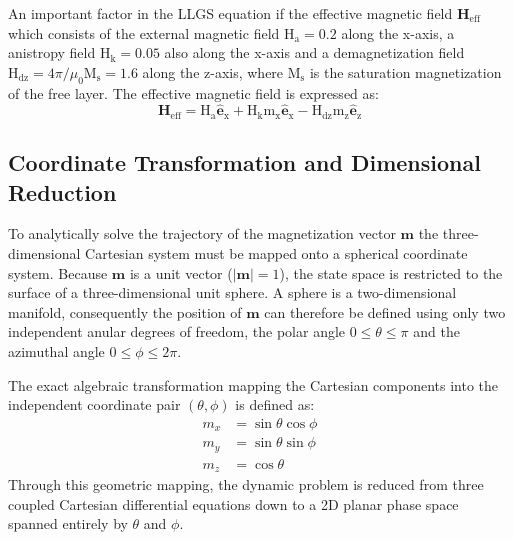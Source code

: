 \documentclass[reprint,amsmath,amssymb,aps, floatfix]{revtex4-2}
\begin{document}
An important factor in the LLGS equation if the effective magnetic field $\mathbf{H}_{\text{eff}}$ which consists of the external magnetic field $\text{H}_\text{a} = 0.2$ along the x-axis, a anistropy field $\text{H}_\text{k} = 0.05$ also along the x-axis and a demagnetization field $\text{H}_\text{dz} = 4\pi \text{/} \mu_0 \text{M}_\text{s} = 1.6$ along the z-axis, where $\text{M}_\text{s}$ is the saturation magnetization of the free layer.
The effective magnetic field is expressed as:
\begin{equation}
    \mathbf{H}_{\text{eff}} = \text{H}_{\text{a}}\hat{\mathbf{e}}_{\text{x}}+\text{H}_{\text{k}}\text{m}_{\text{x}}\hat{\mathbf{e}}_{\text{x}}-\text{H}_{\text{dz}}\text{m}_{\text{z}}\hat{\mathbf{e}}_{\text{z}}
\end{equation}

\subsection{Coordinate Transformation and Dimensional Reduction}
To analytically solve the trajectory of the magnetization vector $\mathbf{m}$ the three-dimensional Cartesian system must be mapped onto a spherical coordinate system.
Because $\mathbf{m}$ is a unit vector ($\left|\mathbf{m}\right|=1$), the state space is restricted to the surface of a three-dimensional unit sphere.
A sphere is a two-dimensional manifold, consequently the position of $\mathbf{m}$ can therefore be defined using only two independent anular degrees of freedom, the polar angle $0\leq\theta\leq\pi$ and the azimuthal angle $0\leq\phi\leq 2\pi$.

The exact algebraic transformation mapping the Cartesian components into the independent coordinate pair $(\theta, \phi)$ is defined as:
\begin{align}
m_x &= \sin\theta\cos\phi \\
m_y &= \sin\theta\sin\phi \\
m_z &= \cos\theta
\end{align}
Through this geometric mapping, the dynamic problem is reduced from three coupled Cartesian differential equations down to a 2D planar phase space spanned entirely by $\theta$ and $\phi$.
\end{document}
